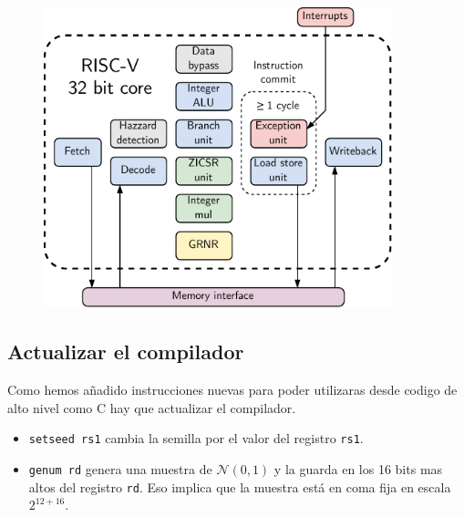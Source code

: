 \begin{figure}[h]
    \centering
    \includegraphics[width=0.9\textwidth]{Imagenes/riscv_core_extended.pdf}
    \caption{\todo}
    \label{fig:bb}
\end{figure}


\subsection{Actualizar el compilador}
\todo

Como hemos añadido instrucciones nuevas para poder utilizaras desde codigo de alto nivel como C hay que actualizar el compilador.

\begin{itemize}
    \item \texttt{setseed rs1} cambia la semilla por el valor del registro \texttt{rs1}.
    \item \texttt{genum rd} genera una muestra de $\mathcal{N}(0,1)$ y la guarda en los 16 bits mas altos del registro \texttt{rd}. Eso implica que la muestra está en coma fija en escala $2^{12 + 16}$.
\end{itemize}


